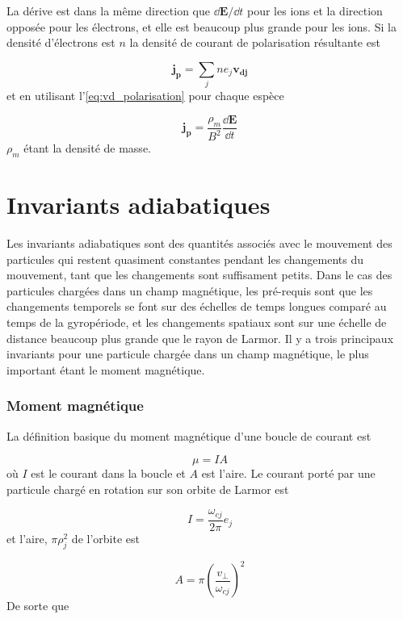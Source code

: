 \documentclass[main.tex]{subfiles}
\begin{document}
La dérive est dans la même direction que \( \dd \bm{E} / \dd t \) pour les ions et la direction opposée pour les électrons, et elle est beaucoup plus grande pour les ions.
Si la densité d'électrons est \( n \) la densité de courant de polarisation résultante est 

\[
	\bm{j_p} = \sum_j n e_j \bm{v_{dj}}
\]
et en utilisant l'\autoref{eq:vd_polarisation} pour chaque espèce

\[
	\bm{j_p} = \frac{\rho_m}{B^2} \frac{\dd \bm{E}}{\dd t}
\]
\( \rho_m \) étant la densité de masse.

\section{Invariants adiabatiques}
\label{sec:invariant_adiabatiques}

Les invariants adiabatiques sont des quantités associés avec le mouvement des particules qui restent quasiment constantes pendant les changements du mouvement, tant que les changements sont suffisament petits.
Dans le cas des particules chargées dans un champ magnétique, les pré-requis sont que les changements temporels se font sur des échelles de temps longues comparé au temps de la gyropériode, et les changements spatiaux sont sur une échelle de distance beaucoup plus grande que le rayon de Larmor.
Il y a trois principaux invariants pour une particule chargée dans un champ magnétique, le plus important étant le moment magnétique.

\subsubsection*{Moment magnétique}

La définition basique du moment magnétique d'une boucle de courant est

\begin{equation}
	\mu = I A
	\label{eq:moment_magnetique_basique}
\end{equation}
où \( I \) est le courant dans la boucle et \( A \) est l'aire.
Le courant porté par une particule chargé en rotation sur son orbite de Larmor est

\begin{equation}
	I = \frac{\omega_{cj}}{2\pi} e_j
	\label{eq:courant_particule_rotation}
\end{equation}
et l'aire, \( \pi \rho_j^2 \) de l'orbite est

\[
	A = \pi \left( \frac{v_\perp}{\omega_{cj}} \right)^2
\]
De sorte que
\end{document}
